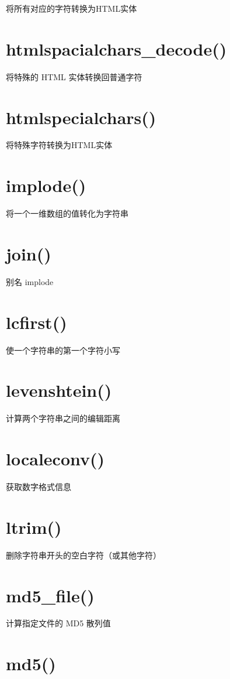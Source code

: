 将所有对应的字符转换为HTML实体

\section{htmlspacialchars\_decode()}

将特殊的 HTML 实体转换回普通字符

\section{htmlspecialchars()}

将特殊字符转换为HTML实体
\section{implode()}

将一个一维数组的值转化为字符串
\section{join()}

别名 implode
\section{lcfirst()}

使一个字符串的第一个字符小写
\section{levenshtein()}

计算两个字符串之间的编辑距离
\section{localeconv()}

获取数字格式信息
\section{ltrim()}

删除字符串开头的空白字符（或其他字符）
\section{md5\_file()}

计算指定文件的 MD5 散列值

\section{md5()}

